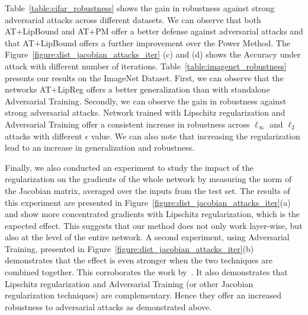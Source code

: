 Table~\ref{table:cifar_robustness} shows the gain in robustness against strong adversarial attacks across different datasets.
We can observe that both AT+LipBound and AT+PM offer a better defense against adversarial attacks and that AT+LipBound offers a further improvement over the Power Method.
The Figure~\ref{figure:dist_jacobian_attacks_iter} (c) and (d) shows the Accuracy under attack with different number of iterations.
Table~\ref{table:imagenet_robustness} presents our results on the ImageNet Dataset.
First, we can observe that the networks AT+LipReg offers a better generalization than with standalone Adversarial Training.
Secondly, we can observe the gain in robustness against strong adversarial attacks.
Network trained with Lipschitz regularization and Adversarial Training offer a consistent increase in robustness across $\ell_\infty$ and $\ell_2$ attacks with different $\epsilon$ value.
We can also note that increasing the regularization lead to an increase in generalization and robustness.

Finally, we also conducted an experiment to study the impact of the regularization on the gradients of the whole network by measuring the norm of the Jacobian matrix, averaged over the inputs from the test set.
The results of this experiment are presented in Figure~\ref{figure:dist_jacobian_attacks_iter}(a) and show more concentrated gradients with  Lipschitz regularization, which is the expected effect.
This suggests that our method does not only work layer-wise, but also at the level of the entire network.
A second experiment, using Adversarial Training, presented in Figure~\ref{figure:dist_jacobian_attacks_iter}(b) demonstrates that the effect is even stronger when the two techniques are combined together.
This corroborates the work by~\citet{farnia2018generalizable}.
It also demonstrates that Lipschitz regularization and Adversarial Training (or other Jacobian regularization techniques) are complementary.
Hence they offer an increased robustness to adversarial attacks as demonstrated above.

